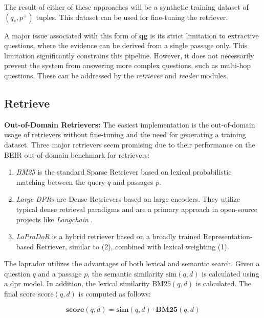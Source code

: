 The result of either of these approaches will be a synthetic training dataset of $(q_s, p^{+})$ tuples. This dataset can be used for fine-tuning the retriever.

A major issue associated with this form of \textbf{\gls{qg}} is its strict limitation to extractive questions, where the evidence can be derived from a single passage only. This limitation significantly constrains this pipeline. However, it does not necessarily prevent the system from answering more complex questions, such as multi-hop questions. These can be addressed by the \textit{retriever} and \textit{reader} modules.


\subsection{Retrieve}
\label{subsec:retrieve}

\textbf{Out-of-Domain Retrievers:} The easiest implementation is the out-of-domain usage of retrievers without fine-tuning and the need for generating a training dataset. Three major retrievers seem promising due to their performance on the BEIR \cite{thakur_beir_2021} out-of-domain benchmark for retrievers:

\begin{enumerate}
    \item \textit{BM25} is the standard Sparse Retriever based on lexical probabilistic matching between the query $q$ and passages $p$.
    \item \textit{Large DPRs} are Dense Retrievers based on large encoders. They utilize typical dense retrieval paradigms and are a primary approach in open-source projects like \textit{Langchain} \cite{noauthor_langchain-ailangchain_nodate}.
    \item \textit{LaPraDoR} is a hybrid retriever based on a broadly trained Representation-based Retriever, similar to (2), combined with lexical weighting (1).
\end{enumerate}

The \gls{laprador} utilizes the advantages of both lexical and semantic search. Given a question $q$ and a passage $p$, the semantic similarity $\text{sim}(q,d)$ is calculated using a \gls{dpr} model. In addition, the lexical similarity $\text{BM25}(q,d)$ is calculated. The final score $\text{score}(q,d)$ is computed as follows:

\begin{equation}
    \mathbf{score}(q, d) = \mathbf{sim}(q, d) \cdot \mathbf{BM25}(q, d)
\end{equation}

